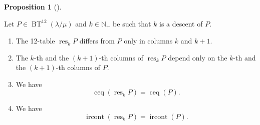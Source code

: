 \documentclass[numbers=enddot,12pt,final,onecolumn,notitlepage]{scrartcl}%
\theoremstyle{definition}
\newtheorem{prop}[theo]{Proposition}
\newenvironment{proposition}[1][]
{\begin{prop}[#1]\begin{leftbar}}
{\end{leftbar}\end{prop}}
\def\BenignTables{{\operatorname{BT}^{12}\left(  \lambda/\mu\right)}}
\begin{document}
\begin{proposition}
\label{prop.descent-resolution-props}Let $P\in\BenignTables$ and $k\in
\mathbb{N}_{+}$ be such that $k$ is a descent of $P$.

\begin{enumerate}
\renewcommand{\theenumi}{\alph{enumi}}
\renewcommand{\labelenumi}{\textbf{(\theenumi)}}

\item \label{pf.lem.BK.res.loc}
The 12-table $\operatorname*{res}\nolimits_{k}P$ differs from $P$
only in columns $k$ and $k+1$.

\item \label{pf.lem.BK.res.loc2}
The $k$-th and the $\left(  k+1\right)  $-th columns of
$\operatorname*{res}\nolimits_{k}P$ depend only on the $k$-th and the $\left(
k+1\right)  $-th columns of $P$.

\item \label{pf.lem.BK.res.ceq}
We have%
\[
\operatorname*{ceq}\left(  \operatorname*{res}\nolimits_{k}P\right)
=\operatorname*{ceq}\left(  P\right) .
\]

\item \label{pf.lem.BK.res.irconts}
We have%
\[
\operatorname*{ircont}\left(  \operatorname*{res}\nolimits_{k}P\right)
=\operatorname*{ircont}\left(  P\right)  .
\]


\end{enumerate}
\end{proposition}
\end{document}
